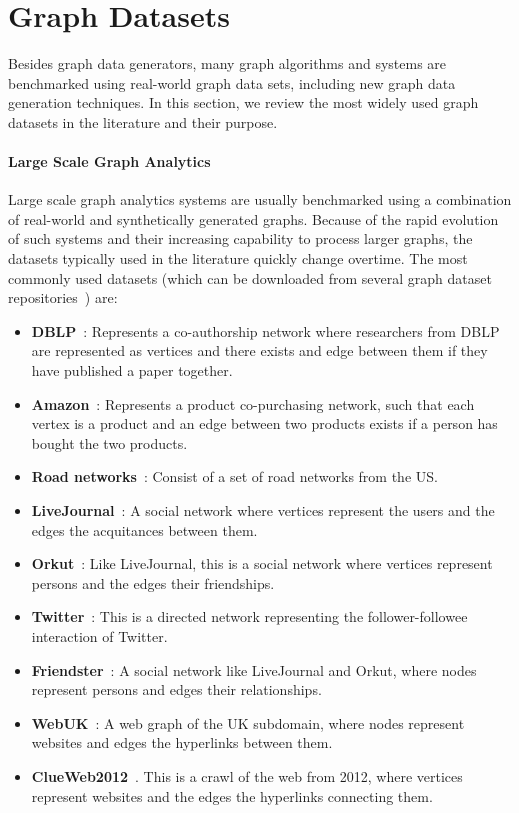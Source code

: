 \section{Graph Datasets}
\label{sec:data_sets}

Besides graph data generators, many graph algorithms and systems are benchmarked using real-world graph data sets, including new graph data generation techniques. In this section, we review the most widely used graph datasets in the literature and their purpose.


\paragraph{Large Scale Graph Analytics}

Large scale graph analytics systems are usually benchmarked using a combination of
real-world and synthetically generated graphs. Because of the rapid evolution of such
systems and their increasing capability to process larger graphs, the datasets
typically used  in the literature quickly change overtime. The most commonly
used datasets (which can be downloaded from several graph dataset
repositories~\cite{snapnets,lawalgo}) are:
\begin{itemize}
  \item \textbf{DBLP}~\cite{yang2015defining}: Represents a co-authorship network where
    researchers from DBLP are represented as vertices and there exists and edge
    between them if they have published a paper together.
  \item \textbf{Amazon}~\cite{yang2015defining}: Represents a product co-purchasing
    network, such that each vertex is a product and an edge between two products
    exists if a person has bought the two products.
  \item \textbf{Road networks}~\cite{leskovec2009community}: Consist of a set of road
    networks from the US.
  \item \textbf{LiveJournal}~\cite{yang2015defining}: A social network where vertices
    represent the users and the edges the acquitances between them.
  \item \textbf{Orkut}~\cite{yang2015defining}: Like LiveJournal, this is a social network
    where vertices represent persons and the edges their friendships.
  \item \textbf{Twitter}~\cite{kwak2010twitter}: This is a directed network representing
    the follower-followee interaction of Twitter.
  \item \textbf{Friendster}~\cite{yang2015defining}: A social network like LiveJournal and
    Orkut, where nodes represent persons and edges their relationships.
  \item \textbf{WebUK}~\cite{delis}: A web graph of the UK subdomain, where nodes represent
    websites and edges the hyperlinks between them.
  \item \textbf{ClueWeb2012}~\cite{clueweb}. This is a crawl of the web from 2012, where
    vertices represent websites and the edges the hyperlinks connecting them.
\end{itemize}

